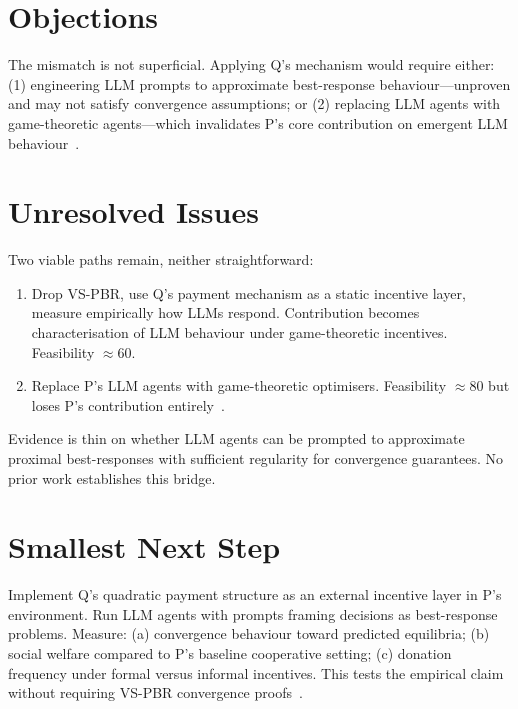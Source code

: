 \documentclass{article}
\begin{document}
\section*{Objections}

The mismatch is not superficial. Applying Q's mechanism would require either: (1) engineering LLM prompts to approximate best-response behaviour---unproven and may not satisfy convergence assumptions; or (2) replacing LLM agents with game-theoretic agents---which invalidates P's core contribution on emergent LLM behaviour~.

\section*{Unresolved Issues}

Two viable paths remain, neither straightforward:

\begin{enumerate}
    \item Drop VS-PBR, use Q's payment mechanism as a static incentive layer, measure empirically how LLMs respond. Contribution becomes characterisation of LLM behaviour under game-theoretic incentives. Feasibility \(\approx 60\).
    \item Replace P's LLM agents with game-theoretic optimisers. Feasibility \(\approx 80\) but loses P's contribution entirely~.
\end{enumerate}

Evidence is thin on whether LLM agents can be prompted to approximate proximal best-responses with sufficient regularity for convergence guarantees. No prior work establishes this bridge.

\section*{Smallest Next Step}

Implement Q's quadratic payment structure as an external incentive layer in P's environment. Run LLM agents with prompts framing decisions as best-response problems. Measure: (a) convergence behaviour toward predicted equilibria; (b) social welfare compared to P's baseline cooperative setting; (c) donation frequency under formal versus informal incentives. This tests the empirical claim without requiring VS-PBR convergence proofs~.
\end{document}
